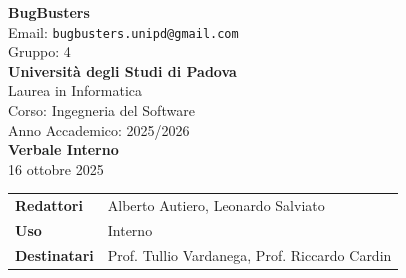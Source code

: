 \documentclass[a4paper,12pt]{article}
\begin{document}
\begin{center}
  
  {\Large\bfseries\color{primaryblue} BugBusters}\\[0.3cm]
  {\small\color{darkgray} Email: \texttt{bugbusters.unipd@gmail.com}} \\[0.1cm]
  {\small\color{darkgray} Gruppo: 4} \\[0.5cm]

  {\large\bfseries Università degli Studi di Padova}\\[0.3cm]
  {\small Laurea in Informatica}\\[0.2cm]
  {\small Corso: Ingegneria del Software}\\[0.2cm]
  {\small Anno Accademico: 2025/2026}\\[0.8cm]

  {\Huge\bfseries\color{primaryblue} Verbale Interno}\\[0.3cm]
  {\Large\color{secondaryblue} 16 ottobre 2025}\\[0.8cm]
\end{center}

\begin{center}
\begin{tcolorbox}[colback=lightgray,colframe=primaryblue,width=0.85\textwidth,arc=3mm,boxrule=0.5pt]
\begin{tabular}{@{}ll@{}}
\textbf{Redattori}    & Alberto Autiero, Leonardo Salviato \\
\textbf{Uso}          & Interno \\
\textbf{Destinatari}  & Prof. Tullio Vardanega, Prof. Riccardo Cardin \\
\end{tabular}
\end{tcolorbox}
\end{center}

\vspace{0.5cm}
\end{document}

